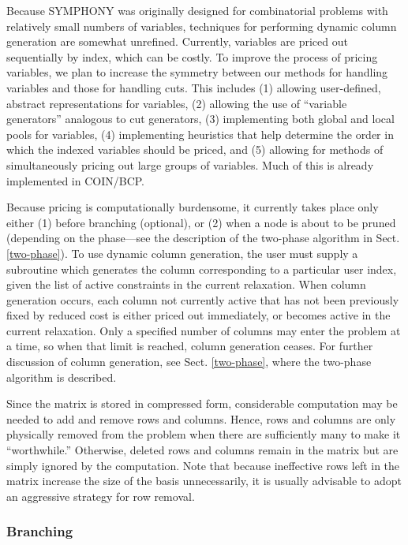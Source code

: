 Because SYMPHONY was originally designed for combinatorial problems
with relatively small numbers of variables, techniques for performing
dynamic column generation are somewhat unrefined. Currently, variables
are priced out sequentially by index, which can be costly. To improve
the process of pricing variables, we plan to increase the symmetry
between our methods for handling variables and those for handling
cuts. This includes (1) allowing user-defined, abstract
representations for variables, (2) allowing the use of ``variable
generators'' analogous to cut generators, (3) implementing both global
and local pools for variables, (4) implementing heuristics that help
determine the order in which the indexed variables should be priced,
and (5) allowing for methods of simultaneously pricing out large
groups of variables. Much of this is already implemented in COIN/BCP.

Because pricing is computationally burdensome, it currently takes
place only either (1) before branching (optional), or (2) when a node
is about to be pruned (depending on the phase---see the description of
the two-phase algorithm in Sect. \ref{two-phase}). To use dynamic
column generation, the user must supply a subroutine which generates
the column corresponding to a particular user index, given the list of
active constraints in the current relaxation. When column generation
occurs, each column not currently active that has not been previously
fixed by reduced cost is either priced out immediately, or becomes
active in the current relaxation. Only a specified number of columns
may enter the problem at a time, so when that limit is reached, column
generation ceases. For further discussion of column generation, see
Sect. \ref{two-phase}, where the two-phase algorithm is described.

Since the matrix is stored in compressed form, considerable
computation may be needed to add and remove rows and columns. Hence,
rows and columns are only physically removed from the problem when
there are sufficiently many to make it ``worthwhile.'' Otherwise,
deleted rows and columns remain in the matrix but are simply ignored
by the computation. Note that because ineffective rows left in the
matrix increase the size of the basis unnecessarily, it is usually
advisable to adopt an aggressive strategy for row removal.

\subsubsection{Branching}
\label{branching}

